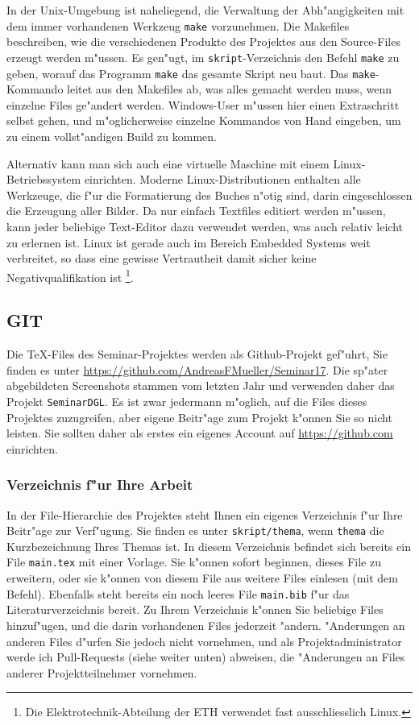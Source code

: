 \documentclass[a4paper,12pt]{article}
\begin{document}
In der Unix-Umgebung ist naheliegend, die Verwaltung der Abh"angigkeiten
mit dem immer vorhandenen Werkzeug \texttt{make} vorzunehmen.
Die Makefiles beschreiben, wie die verschiedenen Produkte des Projektes
aus den Source-Files erzeugt werden m"ussen.
Es gen"ugt, im \texttt{skript}-Verzeichnis den Befehl \texttt{make} zu geben, 
worauf das Programm \texttt{make} das gesamte Skript neu baut.
Das \texttt{make}-Kommando leitet aus den Makefiles ab, was alles gemacht
werden muss, wenn einzelne Files ge"andert werden.
Windows-User m"ussen hier einen Extraschritt selbst gehen, und m"oglicherweise
einzelne Kommandos von Hand eingeben, um zu einem vollst"andigen Build
zu kommen.

Alternativ kann man sich auch eine virtuelle Maschine mit einem
Linux-Betriebssystem einrichten.
Moderne Linux-Distributionen enthalten alle Werkzeuge, die f"ur die
Formatierung des Buches n"otig sind, darin eingeschlossen die
Erzeugung aller Bilder.
Da nur einfach Textfiles editiert werden m"ussen, kann jeder beliebige
Text-Editor dazu verwendet werden, was auch relativ leicht zu erlernen ist.
Linux ist gerade auch im Bereich Embedded Systems weit verbreitet, so
dass eine gewisse Vertrautheit damit sicher keine Negativqualifikation ist%
\footnote{Die Elektrotechnik-Abteilung der ETH verwendet fast ausschliesslich
Linux.}.

\subsection{GIT}
Die \TeX-Files des Seminar-Projektes werden als Github-Projekt gef"uhrt,
Sie finden es unter \url{https://github.com/AndreasFMueller/Seminar17}.
Die sp"ater abgebildeten Screenshots stammen vom letzten Jahr und
verwenden daher das Projekt \verb+SeminarDGL+.
Es ist zwar jedermann m"oglich, auf die Files dieses Projektes zuzugreifen,
aber eigene Beitr"age zum Projekt k"onnen Sie so nicht leisten.
Sie sollten daher als erstes ein eigenes Account auf \url{https://github.com}
einrichten.

\subsubsection{Verzeichnis f"ur Ihre Arbeit}
In der File-Hierarchie des Projektes steht Ihnen ein eigenes Verzeichnis
f"ur Ihre Beitr"age zur Verf"ugung.
Sie finden es unter \texttt{skript/thema}, wenn \texttt{thema}
die Kurzbezeichnung Ihres Themas ist.
In diesem Verzeichnis befindet sich bereits ein File \texttt{main.tex}
mit einer Vorlage.
Sie k"onnen sofort beginnen, dieses File zu erweitern, oder sie k"onnen
von diesem File aus weitere Files einlesen (mit dem \verb++
Befehl).
Ebenfalls steht bereits ein noch leeres File \texttt{main.bib} f"ur
das Literaturverzeichnis bereit.
Zu Ihrem Verzeichnis k"onnen Sie beliebige Files hinzuf"ugen, und
die darin vorhandenen Files jederzeit "andern.
"Anderungen an anderen Files d"urfen Sie jedoch nicht vornehmen, und als
Projektadministrator werde ich Pull-Requests (siehe weiter unten)
abweisen, die "Anderungen an Files anderer Projektteilnehmer vornehmen.
\end{document}
